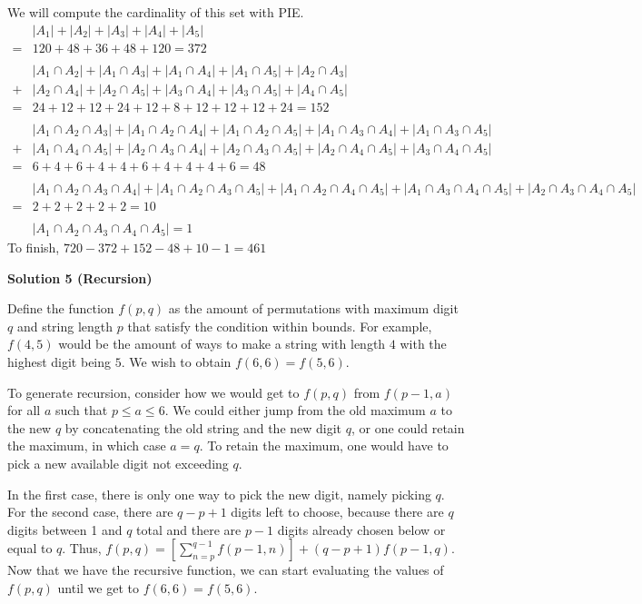 \begin{enumerate}
 We will compute the cardinality of this set with PIE.
 \begin{align*} &|A_1| + |A_2| + |A_3| + |A_4| + |A_5|\\ = &120 + 48 + 36 + 48 + 120 = 372\\ \\ &|A_1 \cap A_2| + |A_1 \cap A_3| + |A_1 \cap A_4| + |A_1 \cap A_5| + |A_2 \cap A_3|\\ + &|A_2 \cap A_4| + |A_2 \cap A_5| + |A_3 \cap A_4| + |A_3 \cap A_5| + |A_4 \cap A_5|\\=&24+12+12+24+12+8+12+12+12+24=152\\ \\ &|A_1 \cap A_2 \cap A_3| + |A_1 \cap A_2 \cap A_4| + |A_1 \cap A_2 \cap A_5| + |A_1 \cap A_3 \cap A_4| + |A_1 \cap A_3 \cap A_5|\\ +& |A_1 \cap A_4 \cap A_5| + |A_2 \cap A_3 \cap A_4| + |A_2 \cap A_3 \cap A_5| +  |A_2 \cap A_4 \cap A_5| + |A_3 \cap A_4 \cap A_5|\\=&6 + 4 + 6 + 4 + 4 + 6 + 4 + 4 + 4 + 6 = 48\\ \\ &|A_1 \cap A_2 \cap A_3 \cap A_4| + |A_1 \cap A_2 \cap A_3 \cap A_5| + |A_1 \cap A_2 \cap A_4 \cap A_5| + |A_1 \cap A_3 \cap A_4 \cap A_5| + |A_2 \cap A_3 \cap A_4 \cap A_5|\\=&2 + 2 + 2 + 2 + 2 = 10\\ \\ &|A_1 \cap A_2 \cap A_3 \cap A_4 \cap A_5| = 1 \end{align*}
To finish, $720 - 372 + 152 - 48 + 10 - 1 = \boxed{461}$




\textbf{Solution 5 (Recursion)}

Define the function $f(p,q)$ as the amount of permutations with maximum digit $q$ and string length $p$ that satisfy the condition within bounds. For example, $f(4,5)$ would be the amount of ways to make a string with length $4$ with the highest digit being $5$. We wish to obtain $f(6,6)=f(5,6)$. 

 To generate recursion, consider how we would get to $f(p,q)$ from $f(p-1,a)$ for all $a$ such that $p\le{a}\le6$. We could either jump from the old maximum $a$ to the new $q$ by concatenating the old string and the new digit $q$, or one could retain the maximum, in which case $a=q$. To retain the maximum, one would have to pick a new available digit not exceeding $q$. 

 In the first case, there is only one way to pick the new digit, namely picking $q$. For the second case, there are $q-p+1$ digits left to choose, because there are $q$ digits between 1 and $q$ total and there are $p-1$ digits already chosen below or equal to $q$. Thus, $f(p,q)=[\sum^{q-1}_{n=p}f(p-1,n)] + (q-p+1)f(p-1,q)$. Now that we have the recursive function, we can start evaluating the values of $f(p,q)$ until we get to $f(6,6)=f(5,6)$. 


\end{enumerate}
